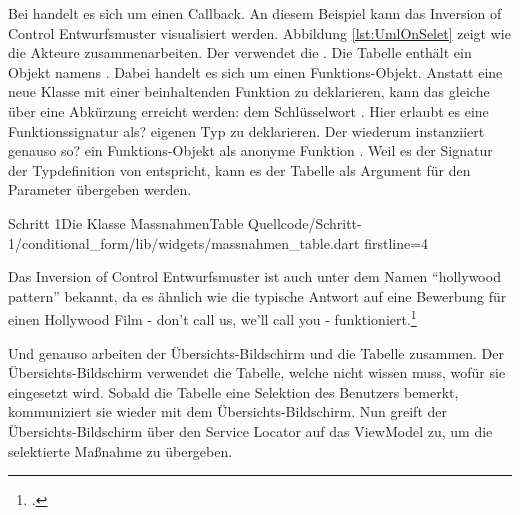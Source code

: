 Bei  handelt es sich um einen Callback.
An diesem Beispiel kann das Inversion of Control Entwurfsmuster visualisiert werden.
Abbildung \ref{lst:UmlOnSelet} zeigt wie die Akteure zusammenarbeiten.
Der  verwendet die .
Die Tabelle enthält ein Objekt namens .
Dabei handelt es sich um einen Funktions-Objekt.
Anstatt eine neue Klasse mit einer beinhaltenden Funktion zu deklarieren, kann das gleiche über eine Abkürzung erreicht werden: dem Schlüsselwort  .
Hier erlaubt es eine Funktionssignatur als? eigenen Typ zu deklarieren.
Der  wiederum instanziiert genauso so? ein Funktions-Objekt als anonyme Funktion .
Weil es der Signatur der Typdefinition von   entspricht, kann es der Tabelle als Argument für den Parameter  übergeben werden. 

\ifIncludeFigures \clearpage \fi

\begin{alexlisting}{Schritt 1}{Die Klasse MassnahmenTable}
  {Quellcode/Schritt-1/conditional_form/lib/widgets/massnahmen_table.dart}
  {firstline=4}
  \label{lst:Schritt1KlasseMassnahmenTable}
\end{alexlisting}

\ifIncludeFigures \clearpage \fi


Das Inversion of Control Entwurfsmuster ist auch unter dem Namen \enquote{hollywood pattern} bekannt, da es ähnlich wie die typische Antwort auf eine Bewerbung für einen Hollywood Film - don’t call us, we’ll call you - funktioniert.\footcite[Vgl.][]{fowler2005InversionOfControl}

Und genauso arbeiten der Übersichts-Bildschirm und die Tabelle zusammen.
Der Übersichts-Bildschirm verwendet die Tabelle, welche nicht wissen muss, wofür sie eingesetzt wird.
Sobald die Tabelle eine Selektion des Benutzers bemerkt, kommuniziert sie wieder mit dem Übersichts-Bildschirm.
Nun greift der Übersichts-Bildschirm über den Service Locator auf das ViewModel zu, um die selektierte Maßnahme zu übergeben.

